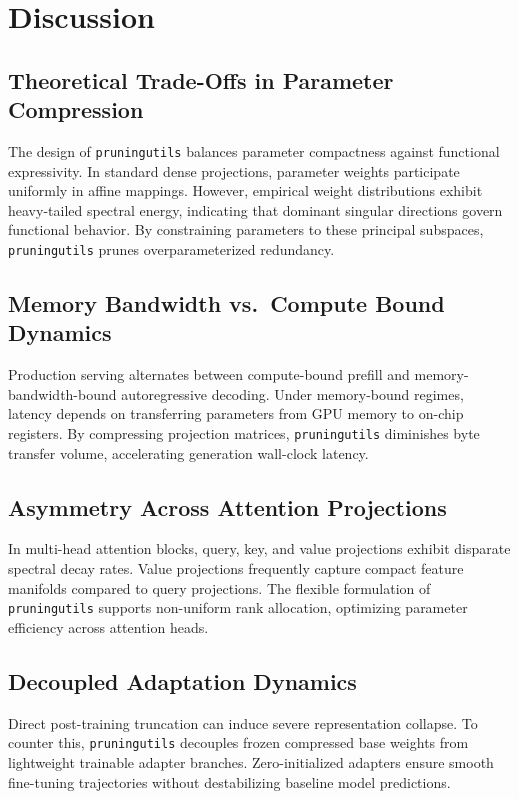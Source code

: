 \section{Discussion}

\subsection{Theoretical Trade-Offs in Parameter Compression}
The design of \texttt{pruningutils} balances parameter compactness against functional expressivity. In standard dense projections, parameter weights participate uniformly in affine mappings. However, empirical weight distributions exhibit heavy-tailed spectral energy, indicating that dominant singular directions govern functional behavior. By constraining parameters to these principal subspaces, \texttt{pruningutils} prunes overparameterized redundancy.

\subsection{Memory Bandwidth vs.\ Compute Bound Dynamics}
Production serving alternates between compute-bound prefill and memory-bandwidth-bound autoregressive decoding. Under memory-bound regimes, latency depends on transferring parameters from GPU memory to on-chip registers. By compressing projection matrices, \texttt{pruningutils} diminishes byte transfer volume, accelerating generation wall-clock latency.

\subsection{Asymmetry Across Attention Projections}
In multi-head attention blocks, query, key, and value projections exhibit disparate spectral decay rates. Value projections frequently capture compact feature manifolds compared to query projections. The flexible formulation of \texttt{pruningutils} supports non-uniform rank allocation, optimizing parameter efficiency across attention heads.

\subsection{Decoupled Adaptation Dynamics}
Direct post-training truncation can induce severe representation collapse. To counter this, \texttt{pruningutils} decouples frozen compressed base weights from lightweight trainable adapter branches. Zero-initialized adapters ensure smooth fine-tuning trajectories without destabilizing baseline model predictions.

